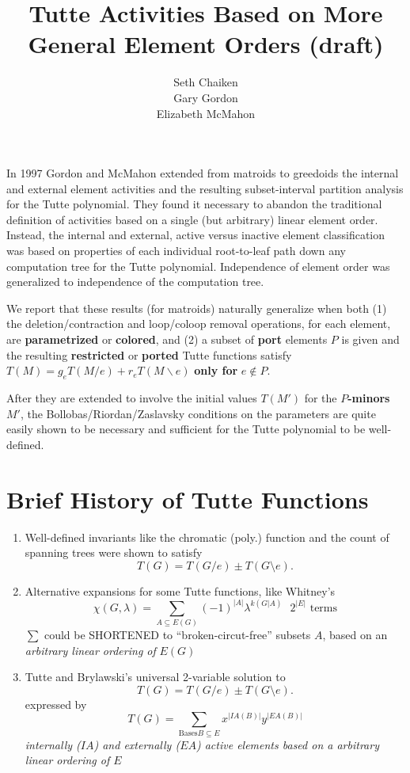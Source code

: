 \documentclass{article}
\title{Tutte Activities Based on More General Element Orders (draft)}
\author{Seth Chaiken\\
Gary Gordon\\
Elizabeth McMahon}
\begin{document}
\maketitle
In 1997 Gordon and McMahon\cite{GordonMcMachonGreedoid} 
extended from matroids to greedoids
the internal and external 
element activities and the resulting subset-interval 
partition analysis for the Tutte polynomial.  They found it necessary
to abandon the traditional definition of activities based on a 
single (but arbitrary) linear element order.  Instead, the internal and 
external, active versus inactive element classification was based on 
properties of each individual root-to-leaf path down any computation tree
for the Tutte polynomial.  Independence of element order was generalized to
independence of the computation tree.

We report that these results (for matroids) naturally generalize when both (1) 
the deletion/contraction and loop/coloop removal operations, for each element,
are \textbf{parametrized} or 
\textbf{colored}, and (2) a subset of \textbf{port} elements 
$P$ is given and the resulting \textbf{restricted} or \textbf{ported}
Tutte functions satisfy $T(M) = g_e T(M/e) + r_e T(M\backslash e)$ 
\textbf{only for} $e\not\in P$.

After they are extended to involve the initial values $T(M')$ for 
the \textbf{$P$-minors} $M'$, the Bollobas/Riordan/Zaslavsky 
conditions on the parameters are quite easily 
shown to be necessary and sufficient for the Tutte polynomial to be
well-defined.

\newpage

\LARGE

\section{Brief History of Tutte Functions}
\begin{enumerate}
\item Well-defined invariants like the chromatic (poly.) function 
and the count of spanning trees were shown to satisfy
\[
T(G) = T(G/e) \pm T(G\setminus e).
\]
\item
Alternative expansions for some Tutte functions, like Whitney's
\[
\chi(G,\lambda) = \sum_{A\subseteq E(G)}(-1)^{|A|}\lambda^{k(G|A)}\text{\ \ \ }2^{|E|}
\text{ terms}
\]
$\sum$ could be SHORTENED to ``broken-circut-free'' subsets $A$, based on
an \textit{arbitrary linear ordering of }$E(G)$
\item
Tutte and Brylawski's universal 2-variable solution to 
\[
T(G) = T(G/e) \pm T(G\setminus e).
\]
expressed by
\[
T(G) = \sum_{\text{Bases}B\subseteq E}x^{|IA(B)|}y^{|EA(B)|}
\]
\textit{ internally ($IA$) and externally ($EA$)
active elements based on a arbitrary linear ordering of $E$}
\end{enumerate}
\end{document}
